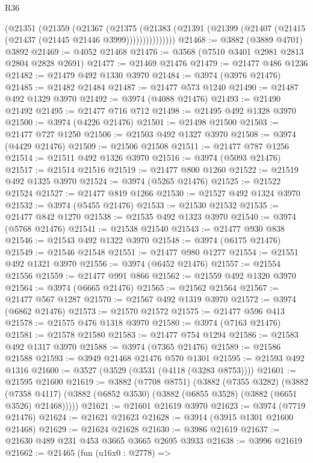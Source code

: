 \begin{lexlean}{R36}
\begin{coremodule}
            (@21351
              (@21359
                (@21367
                  (@21375
                    (@21383
                      (@21391 (@21399 (@21407 (@21415 (@21437 (@21445 @21446 @3999)))))))))))))))
@21468 := @3882 (@3889 @4701) @3892
@21469 := @4052 @21468
@21476 := @3568 (@7510 @3401 @2981 @2813 @2804 @2828 @2691)
@21477 := @21469 @21476
@21479 := @21477 @486 @1236
@21482 := @21479 @492 @1330 @3970
@21484 := @3974 (@3976 @21476)
@21485 := @21482 @21484
@21487 := @21477 @573 @1240
@21490 := @21487 @492 @1329 @3970
@21492 := @3974 (@4088 @21476)
@21493 := @21490 @21492
@21495 := @21477 @716 @712
@21498 := @21495 @492 @1328 @3970
@21500 := @3974 (@4226 @21476)
@21501 := @21498 @21500
@21503 := @21477 @727 @1250
@21506 := @21503 @492 @1327 @3970
@21508 := @3974 (@4429 @21476)
@21509 := @21506 @21508
@21511 := @21477 @787 @1256
@21514 := @21511 @492 @1326 @3970
@21516 := @3974 (@5093 @21476)
@21517 := @21514 @21516
@21519 := @21477 @800 @1260
@21522 := @21519 @492 @1325 @3970
@21524 := @3974 (@5265 @21476)
@21525 := @21522 @21524
@21527 := @21477 @819 @1266
@21530 := @21527 @492 @1324 @3970
@21532 := @3974 (@5455 @21476)
@21533 := @21530 @21532
@21535 := @21477 @842 @1270
@21538 := @21535 @492 @1323 @3970
@21540 := @3974 (@5768 @21476)
@21541 := @21538 @21540
@21543 := @21477 @930 @838
@21546 := @21543 @492 @1322 @3970
@21548 := @3974 (@6175 @21476)
@21549 := @21546 @21548
@21551 := @21477 @980 @1277
@21554 := @21551 @492 @1321 @3970
@21556 := @3974 (@6452 @21476)
@21557 := @21554 @21556
@21559 := @21477 @991 @866
@21562 := @21559 @492 @1320 @3970
@21564 := @3974 (@6665 @21476)
@21565 := @21562 @21564
@21567 := @21477 @567 @1287
@21570 := @21567 @492 @1319 @3970
@21572 := @3974 (@6862 @21476)
@21573 := @21570 @21572
@21575 := @21477 @596 @413
@21578 := @21575 @476 @1318 @3970
@21580 := @3974 (@7163 @21476)
@21581 := @21578 @21580
@21583 := @21477 @754 @1294
@21586 := @21583 @492 @1317 @3970
@21588 := @3974 (@7365 @21476)
@21589 := @21586 @21588
@21593 := @3949 @21468 @21476 @570 @1301
@21595 := @21593 @492 @1316
@21600 := @3527 (@3529 (@3531 (@4118 (@3283 @8753))))
@21601 := @21595 @21600
@21619 := @3882
    (@7708 @8751)
    (@3882
      (@7355 @3282)
      (@3882
        (@7358 @4117)
        (@3882 (@6852 @3530) (@3882 (@6855 @3528) (@3882 (@6651 @3526) @21468)))))
@21621 := @21601 @21619 @3970
@21623 := @3974 (@7719 @21476)
@21624 := @21621 @21623
@21628 := @3914 (@3915 @1301 @21600 @21468)
@21629 := @21624 @21628
@21630 := @3986 @21619
@21637 := @21630 @489 @231 @453 @3665 @3665 @2695 @3933
@21638 := @3996 @21619
@21662 := @21465
    (fun (u16x0 : @2778) =>

\end{coremodule}
\end{lexlean}
